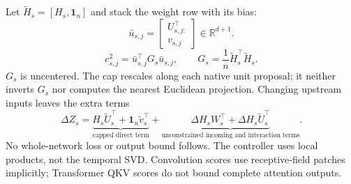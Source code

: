 Let $\widetilde H_s=[H_s,\mathbf1_n]$ and stack the weight row with its bias:
\[
\bar u_{s,j}=\begin{bmatrix}U_{s,j:}^\top\\v_{s,j}\end{bmatrix}\in\mathbb R^{d+1}.
\]
\begin{equation}
c_{s,j}^2=\bar u_{s,j}^\top G_s\bar u_{s,j},\qquad
G_s=\frac1n\widetilde H_s^\top\widetilde H_s .
\label{consol:cap-metric}
\end{equation}
$G_s$ is uncentered. The cap rescales along each native unit proposal;
it neither inverts $G_s$ nor computes the nearest Euclidean projection.
Changing upstream inputs leaves the extra terms
\begin{equation}
\Delta Z_s=
\underbrace{H_s\widetilde U_s^\top+\mathbf1_n\widetilde v_s^\top}_{\text{capped direct term}}
+\underbrace{\Delta H_sW_s^\top+\Delta H_s\widetilde U_s^\top}_{\text{unconstrained incoming and interaction terms}}.
\label{consol:cap-total}
\end{equation}
No whole-network loss or output bound follows. The controller uses local products,
not the temporal SVD. Convolution scores use receptive-field patches implicitly;
Transformer QKV scores do not bound complete attention outputs.
